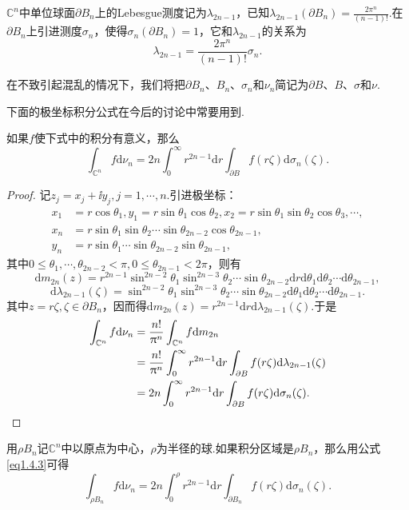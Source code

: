 $\mathbb{C}^n$中单位球面$\partial B_n$上的Lebesgue测度记为$\lambda_{2n-1}$，已知$\lambda_{2n-1}(\partial B_n)=\frac{2\pi^n}{(n-1)!}$.在$\partial B_n$上引进测度$\sigma_n$，使得$\sigma_n(\partial B_n)=1$，它和$\lambda_{2n-1}$的关系为
\begin{equation}\label{eq1.4.2}
	\lambda_{2n-1}=\frac{2\pi^n}{(n-1)!}\sigma_n.
\end{equation}


在不致引起混乱的情况下，我们将把$\partial B_n$、$B_n$、$\sigma_n$和$\nu_n$简记为$\partial B$、$B$、$\sigma$和$\nu$.

下面的极坐标积分公式在今后的讨论中常要用到.
\begin{theorem}\label{thm1.4.1}
	如果$f$使下式中的积分有意义，那么
	\begin{equation}\label{eq1.4.3}
		\int_{\mathbb{C}^n}f\mathrm{d}\nu_n=2n\int_{0}^{\infty}r^{2n-1}\mathrm{d}r\int_{\partial B}f(r\zeta)\mathrm{d}\sigma_n(\zeta).
	\end{equation}
\end{theorem}
\begin{proof}
	记$z_j=x_j+\ii y_j,j=1,\cdots,n.$引进极坐标：
	\begin{align*}
		x_1
		&=r\cos\theta_1,y_1=r\sin\theta_1\cos\theta_2,x_2=r\sin\theta_1\sin\theta_2\cos\theta_3,\cdots,\\
		x_n
		&=r\sin\theta_1\sin\theta_2\cdots\sin\theta_{2n-2} \cos\theta_{2n-1},\\
		y_n
		&=r\sin\theta_1\cdots\sin\theta_{2n-2}\sin\theta_{2n-1},
	\end{align*}
其中$0\le\theta_1,\cdots,\theta_{2n-2}<\pi,0\le\theta_{2n-1}<2\pi$，则有
\[\mathrm{d} m_{2n}(z)=r^{2n-1}\sin^{2n-2}\theta_1\sin^{2n-3}\theta_2\cdots\sin\theta_{2n-2}\mathrm{d}r\mathrm{d}\theta_1\mathrm{d}\theta_2\cdots\mathrm{d}\theta_{2n-1},\]
\[\mathrm{d}\lambda_{2n-1}(\zeta)=\sin^{2n-2}\theta_1\sin^{2n-3}\theta_2\cdots\sin\theta_{2n-2}\mathrm{d}\theta_1\mathrm{d}\theta_2\cdots\mathrm{d}\theta_{2n-1}.\]
其中$z=r\zeta,\zeta\in\partial B_n$，因而得$\mathrm{d}m_{2n}(z)=r^{2n-1}\mathrm{d}r\mathrm{d}\lambda_{2n-1}(\zeta).$于是
\begin{align*}
	\int_{\mathbb{C}^n}f\mathrm{d}\nu_n
	&=\frac{n!}{\pi^n}\int_{\mathbb{C}^n}f\mathrm{d} m_{2n} \\
	&=\frac{n!}{\pi^n}\int_{0}^{\infty}r^{2n-1}\mathrm{d}r\int_{\partial B}f(r\zeta)\mathrm{d}\lambda_{2n-1}(\zeta)\\
	&=2n\int_{0}^{\infty}r^{2n-1}\mathrm{d}r\int_{\partial B} f(r\zeta)\mathrm{d}\sigma_n(\zeta).\qedhere
\end{align*}
\end{proof}
用$\rho B_n$记$\mathbb{C}^n$中以原点为中心，$\rho$为半径的球.如果积分区域是$\rho B_n$，那么用公式\eqref{eq1.4.3}可得
\begin{equation}\label{eq1.4.4}
	\int_{\rho B_n}f\mathrm{d}\nu_n=2n\int_{0}^{\rho} r^{2n-1}\mathrm{d}r\int_{\partial B_n}f(r\zeta)\mathrm{d}\sigma_n(\zeta).
\end{equation}
